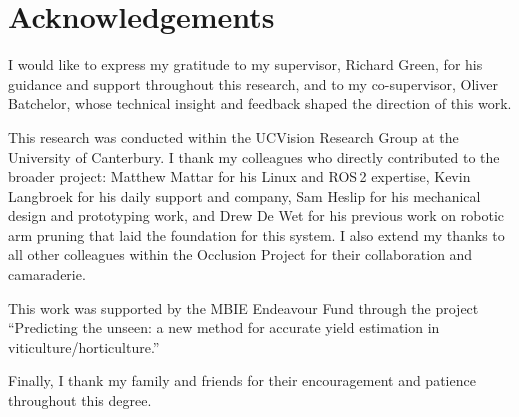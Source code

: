 \chapter*{Acknowledgements}
\label{chap:Acknowledgements}

I would like to express my gratitude to my supervisor, Richard Green, for his guidance and support throughout this research, and to my co-supervisor, Oliver Batchelor, whose technical insight and feedback shaped the direction of this work.

This research was conducted within the UCVision Research Group at the University of Canterbury. I thank my colleagues who directly contributed to the broader project: Matthew Mattar for his Linux and ROS\,2 expertise, Kevin Langbroek for his daily support and company, Sam Heslip for his mechanical design and prototyping work, and Drew De Wet for his previous work on robotic arm pruning that laid the foundation for this system. I also extend my thanks to all other colleagues within the Occlusion Project for their collaboration and camaraderie.

This work was supported by the MBIE Endeavour Fund through the project ``Predicting the unseen: a new method for accurate yield estimation in viticulture/horticulture.''

Finally, I thank my family and friends for their encouragement and patience throughout this degree.
